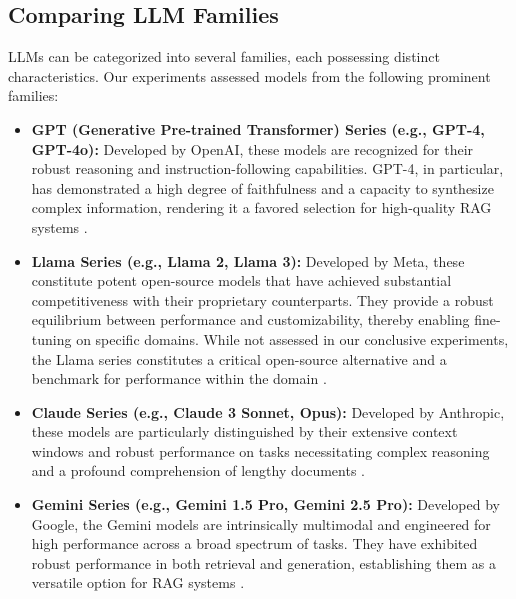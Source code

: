 \subsection{Comparing LLM Families}
LLMs can be categorized into several families, each possessing distinct characteristics. Our experiments assessed models from the following prominent families:
\begin{itemize}
    \item \textbf{GPT (Generative Pre-trained Transformer) Series (e.g., GPT-4, GPT-4o):} Developed by OpenAI, these models are recognized for their robust reasoning and instruction-following capabilities. GPT-4, in particular, has demonstrated a high degree of faithfulness and a capacity to synthesize complex information, rendering it a favored selection for high-quality RAG systems \autocite{openai2024gpt4technicalreport}.
    \item \textbf{Llama Series (e.g., Llama 2, Llama 3):} Developed by Meta, these constitute potent open-source models that have achieved substantial competitiveness with their proprietary counterparts. They provide a robust equilibrium between performance and customizability, thereby enabling fine-tuning on specific domains. While not assessed in our conclusive experiments, the Llama series constitutes a critical open-source alternative and a benchmark for performance within the domain \autocite{touvron2023llama}.
    \item \textbf{Claude Series (e.g., Claude 3 Sonnet, Opus):} Developed by Anthropic, these models are particularly distinguished by their extensive context windows and robust performance on tasks necessitating complex reasoning and a profound comprehension of lengthy documents \cite{anthropic2024claude3}.
    \item \textbf{Gemini Series (e.g., Gemini 1.5 Pro, Gemini 2.5 Pro):} Developed by Google, the Gemini models are intrinsically multimodal and engineered for high performance across a broad spectrum of tasks. They have exhibited robust performance in both retrieval and generation, establishing them as a versatile option for RAG systems \autocite{gemini2023}.
\end{itemize}

